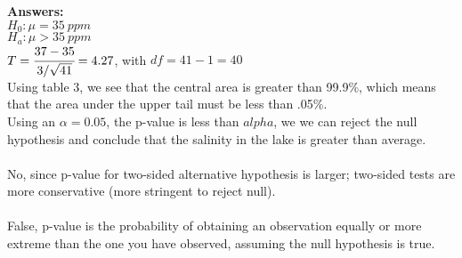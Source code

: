 \documentclass[12pt]{article}
\begin{document}
\noindent \textbf{Answers:} \\
$H_{0}: \mu = 35\ ppm$ \\
$H_{a}: \mu > 35\ ppm$ \\
$T = \cfrac{37-35}{3/\sqrt{41}} = 4.27$, with $df = 41 - 1 = 40$ \\
Using table 3, we see that the central area is greater than 99.9\%, which means that the area under the upper tail must be less than .05\%.\\
Using an $\alpha = 0.05$, the p-value is less than $alpha$, we we can reject the null hypothesis and conclude that the salinity in the lake is greater than average. \\
\\
No, since p-value for two-sided alternative hypothesis is larger; two-sided tests are more conservative (more stringent to reject null). \\
\\
False, p-value is the probability of obtaining an observation equally or more extreme than the one you have observed, assuming the null hypothesis is true. \\
\end{document}
